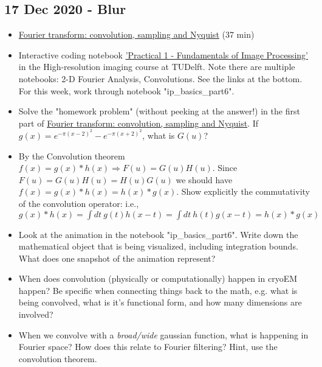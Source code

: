 \documentclass[11pt, oneside]{article}   	%
\begin{document}
\pagebreak
\subsection{17 Dec 2020 - Blur}
\begin{itemize}
	\item \href{https://youtu.be/_F-YDwY9X30}{Fourier transform: convolution, sampling and Nyquist} (37 min)
	\item Interactive coding notebook \href{https://gitlab.tudelft.nl/aj-lab/teaching/-/wikis/NB4020}{'Practical 1 - Fundamentals of Image Processing'} in the High-resolution imaging course at TUDelft. Note there are multiple notebooks: 2-D Fourier Analysis, Convolutions. See the links at the bottom. For this week, work through notebook "ip\_basics\_part6".
\end{itemize}
\begin{itemize}
	\item Solve the "homework problem" (without peeking at the answer!) in the first part of \href{https://youtu.be/_F-YDwY9X30}{Fourier transform: convolution, sampling and Nyquist}. If $g(x) = e^{-\pi(x-2)^2} - e^{-\pi(x+2)^2}$, what is $G(u)$?
	\item By the Convolution theorem $f(x)=g(x)*h(x) \Rightarrow F(u)=G(u)H(u)$. Since $F(u)=G(u)H(u)=H(u)G(u)$ we should have $f(x)=g(x)*h(x)=h(x)*g(x)$. Show explicitly the commutativity of the convolution operator: i.e., $g(x)*h(x)=\int dt \ g(t)h(x-t)=\int dt \ h(t)g(x-t)=h(x)*g(x)$
	\item Look at the animation in the notebook "ip\_basics\_part6". Write down the mathematical object that is being visualized, including integration bounds. What does one snapshot of the animation represent?
	\item When does convolution (physically or computationally) happen in cryoEM happen? Be specific when connecting things back to the math, e.g. what is being convolved, what is it's functional form, and how many dimensions are involved?
	\item When we convolve with a {\it broad/wide} gaussian function, what is happening in Fourier space? How does this relate to Fourier filtering? Hint, use the convolution theorem.

	
\end{itemize}
\end{document}
